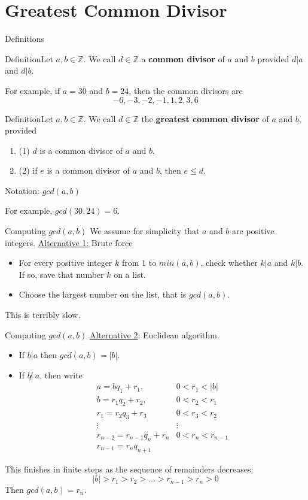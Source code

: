 \documentclass{beamer}
\def\bl[#1]#2{\begin{block}{#1}#2\end{block}}
\def\enumb{\begin{enumerate}}
\def\enume{\end{enumerate}}
\def\itemb{\begin{itemize}}
\def\iteme{\end{itemize}}
\begin{document}
\section{Greatest Common Divisor}

\begin{frame}{Definitions}
\bl[Definition]{Let $a,b\in\mathbb{Z}$. We call $d\in\mathbb{Z}$ a \textbf{common divisor} of $a$ and $b$ provided $d|a$ and $d|b$.}
For example, if $a=30$ and $b=24$, then the common divisors are
\[
-6,-3,-2,-1,1,2,3,6
\]\vspace{-0.4cm}

\bl[Definition]{Let $a,b\in\mathbb{Z}$. We call $d\in\mathbb{Z}$ the \textbf{greatest common divisor} of $a$ and $b$, provided 
\enumb
\item[(1)] $d$ is a common divisor of $a$ and $b$,
\item[(2)] if $e$ is a common divisor of $a$ and $b$, then $e\leq d$.
\enume
Notation: $gcd(a,b)$}
For example, $gcd(30,24)=6$.
\end{frame}

\begin{frame}{Computing $gcd(a,b)$}
We assume for simplicity that $a$  and $b$ are positive integers.
\underline{Alternative 1:} Brute force
\itemb
\item For every positive integer $k$ from $1$ to $min(a,b)$, check whether $k|a$ and $k|b$. If so, save that number $k$ on a list.
\item Choose the largest number on the list, that is $gcd(a,b)$.
\iteme
This is terribly slow. 
\end{frame}

\begin{frame}{Computing $gcd(a,b)$}
\underline{Alternative 2}: Euclidean algorithm.
\itemb
\item If $b|a$ then $gcd(a,b)=|b|$.
\item If $b\not|~a$, then write
\[
\begin{array}{cc}
a=bq_1+r_1,& 0<r_1<|b|\\
b=r_1q_2+r_2,& 0<r_2<r_1\\
r_1=r_2q_3+r_3&0<r_3<r_2\\
\vdots&\vdots\\
r_{n-2}=r_{n-1}q_n+r_n& 0<r_n<r_{n-1}\\
r_{n-1}=r_nq_{n+1}
\end{array}
\]
\iteme
This finishes in finite steps as the sequence of remainders decreases:
\[
|b|>r_1>r_2>\dots>r_{n-1}>r_n>0
\]
Then $gcd(a,b)=r_n$.
\end{frame}
\end{document}
